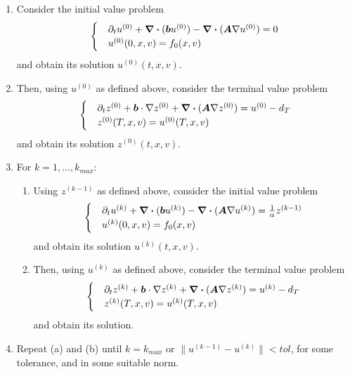 \documentclass{article}  %
\begin{document}
\begin{enumerate}
    \item Consider the initial value problem
    \begin{align} 
        \begin{cases}
        &\partial_t u^{(0)} + \div{(\boldsymbol{b}u^{(0)})} - \div{(\boldsymbol{A} \nabla u^{(0)})} = 0\\
        &u^{(0)}(0,x,v) = f_0(x,v)
        \end{cases}
    \end{align}
    and obtain its solution $u^{(0)}(t,x,v)$.
    \item Then, using $u^{(0)}$ as defined above, consider the terminal value problem 
    \begin{align} 
        \begin{cases} 
            &\partial_t z^{(0)} + \boldsymbol{b} \cdot \nabla z^{(0)} + \div{(\boldsymbol{A} \nabla z^{(0)})} = u^{(0)} - d_T\\
            &z^{(0)}(T,x,v) = u^{(0)}(T,x,v)
        \end{cases}
    \end{align}
    and obtain its solution $z^{(0)}(t,x,v)$.
    \item For $k=1,\dots,k_{max}$:
    \begin{enumerate}
        \item Using $z^{(k-1)}$ as defined above, consider the initial value problem 
        \begin{align} 
            \begin{cases}
                &\partial_t u^{(k)} + \div{(\boldsymbol{b}u^{(k)})} - \div{(\boldsymbol{A} \nabla u^{(k)})} = \frac{1}{\alpha} z^{(k-1)}\\
                &u^{(k)}(0,x,v) = f_0(x,v)
            \end{cases}
        \end{align}
        and obtain its solution $u^{(k)}(t,x,v)$.
        \item Then, using $u^{(k)}$ as defined above, consider the terminal value problem 
        \begin{align}
            \begin{cases}
                &\partial_t z^{(k)} + \boldsymbol{b} \cdot \nabla z^{(k)} + \div{(\boldsymbol{A} \nabla z^{(k)})} = u^{(k)} - d_T\\
                &z^{(k)}(T,x,v) = u^{(k)}(T,x,v)
            \end{cases} 
        \end{align} 
        and obtain its solution.
    \end{enumerate}
    \item Repeat (a) and (b) until $k=k_{max}$ or $\lVert u^{(k-1)} - u^{(k)} \rVert < tol$, for some tolerance, and in some suitable norm.
\end{enumerate}
\end{document}
